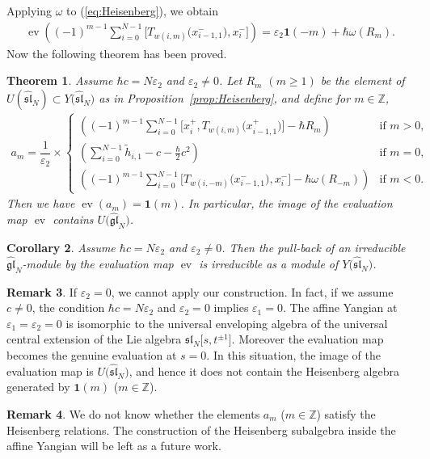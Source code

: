 \documentclass[pdftex]{sigma}
\newtheorem{thm}{Theorem}[section]
\newtheorem{cor}[thm]{Corollary}
\theoremstyle{definition}
\newtheorem{rem}[thm]{Remark}
\numberwithin{equation}{section}
\DeclareMathOperator{\ev}{ev}
\newcommand{\ve}{\varepsilon}
\newcommand{\bbZ}{\mathbb{Z}}
\newcommand{\affY}{Y\big(\affsl\big)}
\newcommand{\gl}{\mathfrak{gl}}
\newcommand{\affsl}{\hat{\mathfrak{sl}}_N}
\newcommand{\bfid}{\mathbf{1}}
\begin{document}
Applying $\omega$ to (\ref{eq:Heisenberg}), we obtain
\begin{gather*}
\ev\left( (-1)^{m-1} \sum_{i=0}^{N-1} \big[T_{w(i,m)}\big(x_{i-1,1}^-\big), x_{i}^-\big] \right) = \ve_2 \bfid(-m) + \hbar \omega(R_m).
\end{gather*}
Now the following theorem has been proved.
\begin{thm}\label{thm:image}Assume $\hbar c =N\ve_2$ and $\ve_2 \neq 0$. Let $R_m$ $(m \geq 1)$ be the element of $U(\hat{\mathfrak{sl}}_N) \subset \affY$ as in Proposition~{\rm \ref{prop:Heisenberg}}, and define for $m \in \bbZ$,
\begin{gather*}
a_{m} = \dfrac{1}{\ve_2} \times \begin{cases}
\displaystyle \left( (-1)^{m-1} \sum_{i=0}^{N-1} \big[x_{i}^+, T_{w(i,m)}\big(x_{i-1,1}^+\big)\big] - \hbar R_m\right) & \text{if $m>0$},\\
\displaystyle \left( \sum_{i=0}^{N-1} \tilde{h}_{i,1} - c - \tfrac{\hbar}{2} c^2\right) & \text{if $m=0$},\\
\displaystyle \left((-1)^{m-1} \sum_{i=0}^{N-1} \big[T_{w(i,-m)}\big(x_{i-1,1}^-\big),x_{i}^-\big] - \hbar \omega(R_{-m})\right) & \text{if $m<0$}.
\end{cases}
\end{gather*}
Then we have $\ev(a_m) = \bfid(m)$. In particular, the image of the evaluation map $\ev$ contains $U\big(\hat{\gl}_N\big)$.
\end{thm}

\begin{cor}Assume $\hbar c =N\ve_2$ and $\ve_2 \neq 0$. Then the pull-back of an irreducible $\hat{\gl}_N$-module by the evaluation map $\ev$ is irreducible as a module of $\affY$.
\end{cor}

\begin{rem}If $\ve_2 = 0$, we cannot apply our construction. In fact, if we assume $c \neq 0$, the condition $\hbar c = N\ve_2$ and $\ve_2 = 0$ implies $\ve_1=0$. The affine Yangian at $\ve_1 = \ve_2 = 0$ is isomorphic to the universal enveloping algebra of the universal central extension of the Lie algebra $\mathfrak{sl}_N\big[s,t^{\pm 1}\big]$. Moreover the evaluation map becomes the genuine evaluation at $s=0$. In this situation, the image of the evaluation map is $U\big(\affsl\big)$, and hence it does not contain the Heisenberg algebra generated by $\bfid(m)$ ($m\in \bbZ$).
\end{rem}
\begin{rem}We do not know whether the elements $a_m$ ($m \in \bbZ$) satisfy the Heisenberg relations. The construction of the Heisenberg subalgebra inside the affine Yangian will be left as a future work.
\end{rem}
\end{document}
